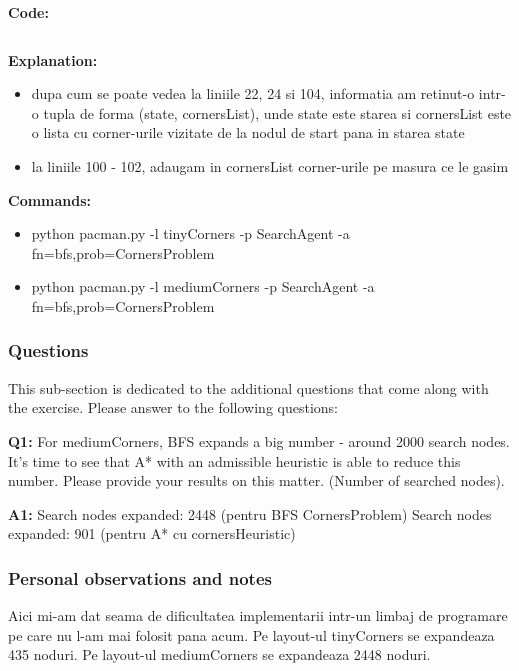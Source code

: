 \textbf{Code:}

\inputminted[linenos]{python}{code/05_corner_problem.py}


\textbf{Explanation:}
\begin{itemize}
    \setlength\itemsep{0em}
    \item dupa cum se poate vedea la liniile 22, 24 si 104, informatia am retinut-o intr-o tupla de forma (state, cornersList), unde state este starea si cornersList este o lista cu corner-urile vizitate de la nodul de start pana in starea state
\item la liniile 100 - 102, adaugam in cornersList corner-urile pe masura ce le gasim %

\end{itemize}


\textbf{Commands:}
\begin{itemize}
    \setlength\itemsep{0em}
    \item  python pacman.py -l tinyCorners -p SearchAgent -a fn=bfs,prob=CornersProblem
\item python pacman.py -l mediumCorners -p SearchAgent -a fn=bfs,prob=CornersProblem%
        
\end{itemize}

\subsubsection{Questions}
This sub-section is dedicated to the additional questions that come along with the exercise. Please answer to the following questions:\newline


\textbf{Q1:} For mediumCorners, BFS expands a big number - around 2000 search nodes.  It’s time to see that A* with an admissible heuristic is able to reduce this number. Please provide your results on this matter. (Number of searched nodes).

\textbf{A1:} Search nodes expanded: 2448 (pentru BFS CornersProblem)
\newline
Search nodes expanded: 901 (pentru A* cu cornersHeuristic)


\subsubsection{Personal observations and notes}
Aici mi-am dat seama de dificultatea implementarii intr-un limbaj de programare pe care nu l-am mai folosit pana acum. \newline
Pe layout-ul tinyCorners se expandeaza 435 noduri. \newline
Pe layout-ul mediumCorners se expandeaza 2448 noduri. 
\vspace{0.75cm}


